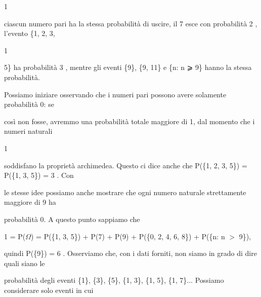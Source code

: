 \documentclass[a4paper,portrait,12pt]{article}
\begin{document}
1


\begin{flushleft}
ciascun numero pari ha la stessa probabilit\`{a} di uscire, il 7 esce con probabilit\`{a} 2 , l'evento \{1, 2, 3,
\end{flushleft}


1


\begin{flushleft}
5\} ha probabilit\`{a} 3 , mentre gli eventi \{9\}, \{9, 11\} e \{n: n ⩾ 9\} hanno la stessa probabilit\`{a}.
\end{flushleft}


\begin{flushleft}
Possiamo iniziare osservando che i numeri pari possono avere solamente probabilit\`{a} 0: se
\end{flushleft}


\begin{flushleft}
così non fosse, avremmo una probabilit\`{a} totale maggiore di 1, dal momento che i numeri naturali
\end{flushleft}


1


\begin{flushleft}
soddisfano la propriet\`{a} archimedea. Questo ci dice anche che P(\{1, 2, 3, 5\}) = P(\{1, 3, 5\}) = 3 . Con
\end{flushleft}


\begin{flushleft}
le stesse idee possiamo anche mostrare che ogni numero naturale strettamente maggiore di 9 ha
\end{flushleft}


\begin{flushleft}
probabilit\`{a} 0. A questo punto sappiamo che
\end{flushleft}


\begin{flushleft}
1 = P($\Omega$) = P(\{1, 3, 5\}) + P(7) + P(9) + P(\{0, 2, 4, 6, 8\}) + P(\{n: n $>$ 9\}),
\end{flushleft}


\begin{flushleft}
quindi P(\{9\}) = 6 . Osserviamo che, con i dati forniti, non siamo in grado di dire quali siano le
\end{flushleft}


\begin{flushleft}
probabilit\`{a} degli eventi \{1\}, \{3\}, \{5\}, \{1, 3\}, \{1, 5\}, \{1, 7\}... Possiamo considerare solo eventi in cui
\end{flushleft}
\end{document}
